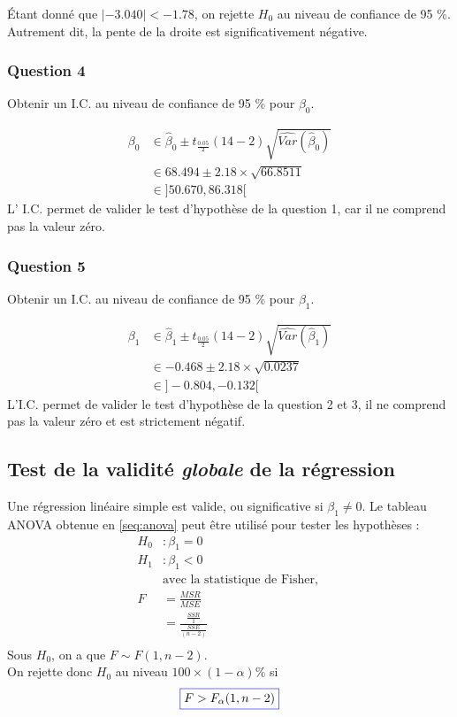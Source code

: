 \documentclass[11pt,french]{report}
\begin{document}
Étant donné que $|-3.040| < -1.78$, on rejette $H_0$ au niveau de confiance de 95 \%. Autrement dit, la pente de la droite est significativement négative.

\subsubsection*{Question 4}
Obtenir un I.C. au niveau de confiance de 95 \% pour $\beta_0$.

\begin{align*}
\beta_0 &\in \hat{\beta}_0 \pm t_{\frac{0.05}{2}}(14-2)\sqrt{\widehat{Var}(\hat{\beta}_0)} \\
& \in 68.494 \pm 2.18 \times \sqrt{66.8511} \\
&\in \big] 50.670, 86.318 \big[
\end{align*}
L' I.C. permet de valider le test d'hypothèse de la question 1, car il ne comprend pas la valeur zéro.

\subsubsection*{Question 5}
Obtenir un I.C. au niveau de confiance de 95 \% pour $\beta_1$.

\begin{align*}
\beta_1 &\in \hat{\beta}_1 \pm t_{\frac{0.05}{2}}(14-2)\sqrt{\widehat{Var}(\hat{\beta}_1)} \\
& \in -0.468 \pm 2.18 \times \sqrt{0.0237} \\
&\in \big] -0.804, -0.132 \big[
\end{align*}
L'I.C. permet de valider le test d'hypothèse de la question 2 et 3, il ne comprend pas la valeur zéro et est strictement négatif.

\subsection{Test de la validité \emph{globale} de la régression}
Une régression linéaire simple est valide, ou significative si $\beta_1 \neq 0$. Le tableau ANOVA obtenue en \ref{seq:anova} peut être utilisé pour tester les hypothèses :
\begin{align*}
H_0 &: \beta_1 = 0\\
H_1 &: \beta_1 < 0 \\
&\text{avec la statistique de Fisher, } \\
F &= \frac{MSR}{MSE} \\
&= \frac{\frac{SSR}{1}}{\frac{SSE}{(n-2)}} \\
\end{align*}
Sous $H_0$, on a que $F \sim F(1, n-2)$. \\
On rejette donc $H_0$ au niveau $100 \times (1 - \alpha) \%$ si
\begin{equation}
\label{eq:fisher}
\color{blue}
\boxed{\color{black}
F > F_{\alpha}(1, n-2)}
\end{equation}
\end{document}
